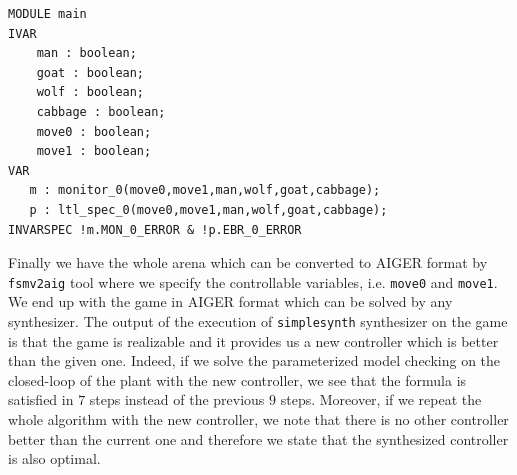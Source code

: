 \begin{lstlisting}[language=smv, caption=Ferryman ASAP: main module]
MODULE main
IVAR
    man : boolean;
    goat : boolean;
    wolf : boolean;
    cabbage : boolean;
    move0 : boolean;
    move1 : boolean;
VAR
   m : monitor_0(move0,move1,man,wolf,goat,cabbage);
   p : ltl_spec_0(move0,move1,man,wolf,goat,cabbage);
INVARSPEC !m.MON_0_ERROR & !p.EBR_0_ERROR
\end{lstlisting}

Finally we have the whole arena which can be converted to AIGER format by \lstinline{fsmv2aig} tool where we specify the controllable variables, i.e. \lstinline{move0} and \lstinline{move1}.
We end up with the game in AIGER format which can be solved by any synthesizer.
The output of the execution of \lstinline{simplesynth} synthesizer on the game is that the game is realizable and it provides us a new controller which is better than the given one.
Indeed, if we solve the parameterized model checking on the closed-loop of the plant with the new controller, we see that the formula is satisfied in $7$ steps instead of the previous $9$ steps.
Moreover, if we repeat the whole algorithm with the new controller, we note that there is no other controller better than the current one and therefore we state that the synthesized controller is also optimal.
